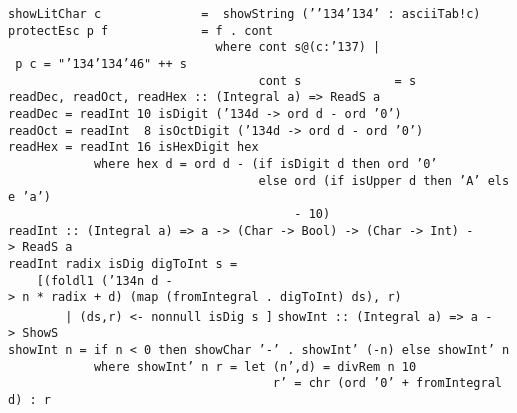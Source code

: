 \mbox{\tt showLitChar\ c\ \ \ \ \ \ \ \ \ \ \ \ \ \ =\ \ showString\ ('{\char'134}{\char'134}'\ :\ asciiTab!c)}
%
\eprogB\noindent\bprogB
\mbox{\tt protectEsc\ p\ f\ \ \ \ \ \ \ \ \ \ \ \ \ =\ f\ .\ cont}\\
\mbox{\tt \ \ \ \ \ \ \ \ \ \ \ \ \ \ \ \ \ \ \ \ \ \ \ \ \ \ \ \ \ where\ cont\ s@(c:{\char'137})\ |\ p\ c\ =\ "{\char'134}{\char'134}{\char'46}"\ ++\ s}\\
\mbox{\tt \ \ \ \ \ \ \ \ \ \ \ \ \ \ \ \ \ \ \ \ \ \ \ \ \ \ \ \ \ \ \ \ \ \ \ cont\ s\ \ \ \ \ \ \ \ \ \ \ \ \ =\ s}
\eprogB\noindent\bprogB
\mbox{\tt readDec,\ readOct,\ readHex\ ::\ (Integral\ a)\ =>\ ReadS\ a}\\
\mbox{\tt readDec\ =\ readInt\ 10\ isDigit\ ({\char'134}d\ ->\ ord\ d\ -\ ord\ '0')}\\
\mbox{\tt readOct\ =\ readInt\ \ 8\ isOctDigit\ ({\char'134}d\ ->\ ord\ d\ -\ ord\ '0')}\\
\mbox{\tt readHex\ =\ readInt\ 16\ isHexDigit\ hex}\\
\mbox{\tt \ \ \ \ \ \ \ \ \ \ \ \ where\ hex\ d\ =\ ord\ d\ -\ (if\ isDigit\ d\ then\ ord\ '0'}\\
\mbox{\tt \ \ \ \ \ \ \ \ \ \ \ \ \ \ \ \ \ \ \ \ \ \ \ \ \ \ \ \ \ \ \ \ \ \ \ else\ ord\ (if\ isUpper\ d\ then\ 'A'\ else\ 'a')}\\
\mbox{\tt \ \ \ \ \ \ \ \ \ \ \ \ \ \ \ \ \ \ \ \ \ \ \ \ \ \ \ \ \ \ \ \ \ \ \ \ \ \ \ \ -\ 10)}
%
%
%
\eprogB\noindent\bprogB
\mbox{\tt readInt\ ::\ (Integral\ a)\ =>\ a\ ->\ (Char\ ->\ Bool)\ ->\ (Char\ ->\ Int)\ ->\ ReadS\ a}\\
\mbox{\tt readInt\ radix\ isDig\ digToInt\ s\ =}\\
\mbox{\tt \ \ \ \ [(foldl1\ ({\char'134}n\ d\ ->\ n\ *\ radix\ +\ d)\ (map\ (fromIntegral\ .\ digToInt)\ ds),\ r)}\\
\mbox{\tt \ \ \ \ \ \ \ \ |\ (ds,r)\ <-\ nonnull\ isDig\ s\ ]}
%
\eprogB\noindent\bprogB
\mbox{\tt showInt\ ::\ (Integral\ a)\ =>\ a\ ->\ ShowS}\\
\mbox{\tt showInt\ n\ =\ if\ n\ <\ 0\ then\ showChar\ '-'\ .\ showInt'\ (-n)\ else\ showInt'\ n}\\
\mbox{\tt \ \ \ \ \ \ \ \ \ \ \ \ where\ showInt'\ n\ r\ =\ let\ (n',d)\ =\ divRem\ n\ 10}\\
\mbox{\tt \ \ \ \ \ \ \ \ \ \ \ \ \ \ \ \ \ \ \ \ \ \ \ \ \ \ \ \ \ \ \ \ \ \ \ \ \ r'\ =\ chr\ (ord\ '0'\ +\ fromIntegral\ d)\ :\ r}\\
